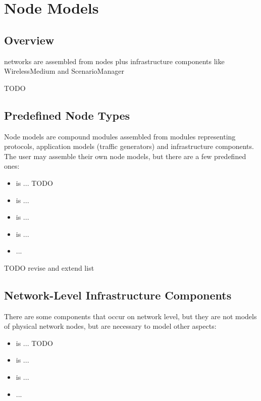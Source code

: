\chapter{Node Models}
\label{cha:node-models}

\section{Overview}

networks are assembled from nodes plus infrastructure components like WirelessMedium
and ScenarioManager 

TODO

\section{Predefined Node Types}

Node models are compound modules assembled from modules representing
protocols, application models (traffic generators) and infrastructure
components. The user may assemble their own node models, but there
are a few predefined ones:

\begin{itemize}
\item {} is ... TODO
\item {} is ...
\item {} is ...
\item {} is ...
\item ...
\end{itemize}

TODO revise and extend list

\section{Network-Level Infrastructure Components}

There are some components that occur on network level, but they
are not models of physical network nodes, but are necessary 
to model other aspects:

\begin{itemize}
\item {} is ... TODO
\item {} is ...
\item {} is ...
\item ...
\end{itemize}

